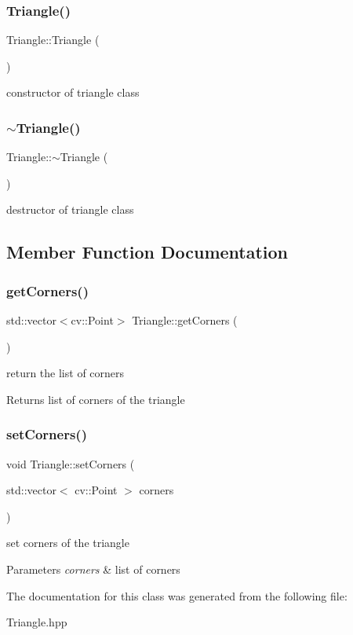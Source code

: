 \subsubsection{\texorpdfstring{Triangle()}{Triangle()}}
{\footnotesize\ttfamily Triangle\+::\+Triangle (\begin{DoxyParamCaption}{ }\end{DoxyParamCaption})}

constructor of triangle class \mbox{\label{class_triangle_a5199760a17454f4dc94c855a57e3a152}} 
\subsubsection{\texorpdfstring{$\sim$\+Triangle()}{~Triangle()}}
{\footnotesize\ttfamily Triangle\+::$\sim$\+Triangle (\begin{DoxyParamCaption}{ }\end{DoxyParamCaption})}

destructor of triangle class 

\subsection{Member Function Documentation}
\mbox{\label{class_triangle_a0c77555fd0e47f1344c23fa880f43777}} 
\subsubsection{\texorpdfstring{get\+Corners()}{getCorners()}}
{\footnotesize\ttfamily std\+::vector$<$cv\+::\+Point$>$ Triangle\+::get\+Corners (\begin{DoxyParamCaption}{ }\end{DoxyParamCaption})}

return the list of corners \begin{DoxyReturn}{Returns}
list of corners of the triangle 
\end{DoxyReturn}
\mbox{\label{class_triangle_ad2d4cecee7e87e10d8b2787199d784c2}} 
\subsubsection{\texorpdfstring{set\+Corners()}{setCorners()}}
{\footnotesize\ttfamily void Triangle\+::set\+Corners (\begin{DoxyParamCaption}\item[{std\+::vector$<$ cv\+::\+Point $>$}]{corners }\end{DoxyParamCaption})}

set corners of the triangle 
\begin{DoxyParams}{Parameters}
{\em corners} & list of corners \\
\hline
\end{DoxyParams}


The documentation for this class was generated from the following file\+:\begin{DoxyCompactItemize}
\item 
Triangle.\+hpp\end{DoxyCompactItemize}
